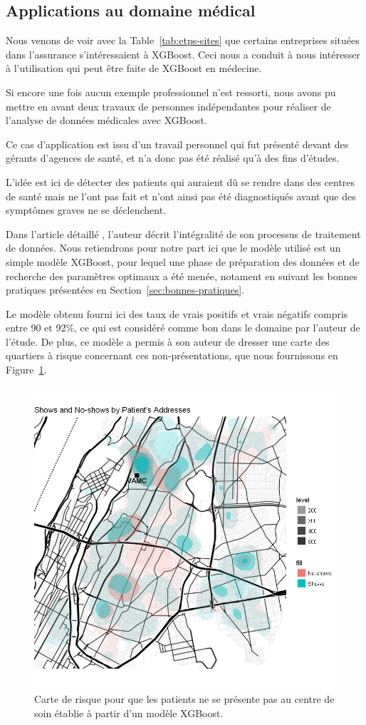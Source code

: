 \subsection{Applications au domaine médical}
Nous venons de voir avec la Table~\ref{tab:etps-sites} que certains entreprises situées dans l'assurance s'intéressaient à XGBoost. Ceci nous a conduit à nous intéresser à l'utilisation qui peut être faite de XGBoost en médecine.

Si encore une fois aucun exemple professionnel n'est ressorti, nous avons pu mettre en avant deux travaux de personnes indépendantes pour réaliser de l'analyse de données médicales avec XGBoost.

Ce cas d'application est issu d'un travail personnel qui fut présenté devant des gérants d'agences de santé, et n'a donc pas été réalisé qu'à des fins \og d'études\fg. 

L'idée est ici de détecter des patients qui auraient dû se rendre dans des centres de santé mais ne l'ont pas fait et n'ont ainsi pas été diagnostiqués avant que des symptômes graves ne se déclenchent. 

Dans l'article détaillé \cite{bib:noshow}, l'auteur décrit l'intégralité de son processus de traitement de données. Nous retiendrons pour notre part ici que le modèle utilisé est un simple modèle XGBoost, pour lequel une phase de préparation des données et de recherche des paramètres optimaux a été menée, notament en suivant les bonnes pratiques présentées en Section~\ref{sec:bonnes-pratiques}.

Le modèle obtenu fourni ici des taux de vrais positifs et vrais négatifs compris entre 90 et 92\%, ce qui est considéré comme bon dans le domaine par l'auteur de l'étude. De plus, ce modèle a permis à son auteur de dresser une carte des quartiers à risque concernant ces non-présentations, que nous fournissons en Figure~\ref{fig:noshow}.

\begin{figure}[ht]
	\begin{margincap}
		\centering
		\includegraphics[width=.6\textwidth]{images/Applications/noshow}
		\caption{Carte de risque pour que les patients ne se présente pas au centre de soin établie à partir d'un modèle XGBoost.}
		\label{fig:noshow}
	\end{margincap}
\end{figure}

